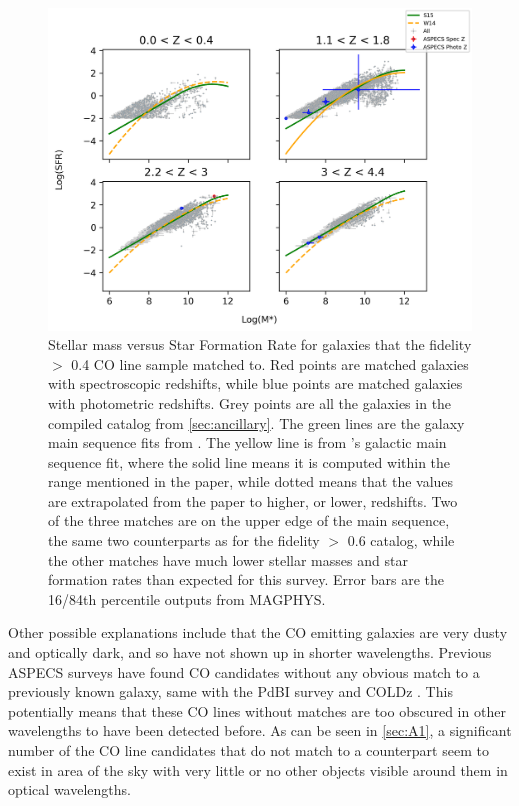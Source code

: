 \begin{figure}[!htbp]
\centering \includegraphics[width=120mm]{No_Cut_Mstar_vs_SFR_all_closest_sep_1_0_sn_fid_40.png}
\caption{Stellar mass versus Star Formation Rate for galaxies that the fidelity $>$ 0.4 CO line sample matched to. Red points are matched galaxies with spectroscopic redshifts, while blue points are matched galaxies with photometric redshifts. Grey points are all the galaxies in the compiled catalog from \ref{sec:ancillary}. The green lines are the galaxy main sequence fits from \cite{schreiber2015herschel}. The yellow line is from \cite{Whitaker_2014}'s galactic main sequence fit, where the solid line means it is computed within the range mentioned in the paper, while dotted means that the values are extrapolated from the paper to higher, or lower, redshifts. Two of the three matches are on the upper edge of the main sequence, the same two counterparts as for the fidelity $>$ 0.6 catalog, while the other matches have much lower stellar masses and star formation rates than expected for this survey. Error bars are the 16/84th percentile outputs from MAGPHYS.}
\label{fig:fid_40_cross}
\end{figure}


Other possible explanations include that the CO emitting galaxies are very dusty and optically dark, and so have not shown up in shorter wavelengths. Previous ASPECS surveys have found CO candidates without any obvious match to a previously known galaxy, same with the PdBI survey and COLDz \cite{decarli2014molecular, pavesi2018co}. This potentially means that these CO lines without matches are too obscured in other wavelengths to have been detected before. As can be seen in \ref{sec:A1}, a significant number of the CO line candidates that do not match to a counterpart seem to exist in area of the sky with very little or no other objects visible around them in optical wavelengths. 


